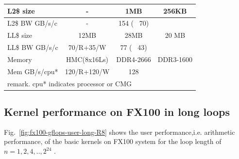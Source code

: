 \documentclass[conference]{IEEEtran}
\begin{document}
\begin{table}[tb]
\begin{tabular}{l|c|c|c}
L2\$ size		&	-			&	1MB	&	256KB	\\ \hline
L2\$ BW GB/s/c	&	-			&	154 ( ~70)	\\ \hline
LL\$ size		&	12MB		&	28MB	&	20 MB	\\ \hline
LL\$ BW GB/s/c	&	70/R+35/W	&	77 ( ~43)	\\ \hline
Memory			&	HMC(8x16Ls)	&	DDR4-2666	& DDR3-1600	\\ \hline
Mem GB/s/cpu*	&	120/R+120/W	&	128	\\ \hline
\multicolumn{4}{l}{\scriptsize\hspace{5mm} remark. cpu* indicates processor or CMG }\\
\end{tabular}
\fi
\end{table}


\subsection{Kernel performance on FX100 in long loops}
\label{subsection:long-kernels-fx100}
%
% 
% 
% 
%
\fi
%
Fig.~\ref{fig:fx100-gflops-user-long-R8} shows the 
user performance,i.e. arithmetic performance, of the basic kernels
on FX100 system
for the loop length of
\begin{math}
n=1,2,4,..,2^{24}
\end{math}
.
\end{document}
